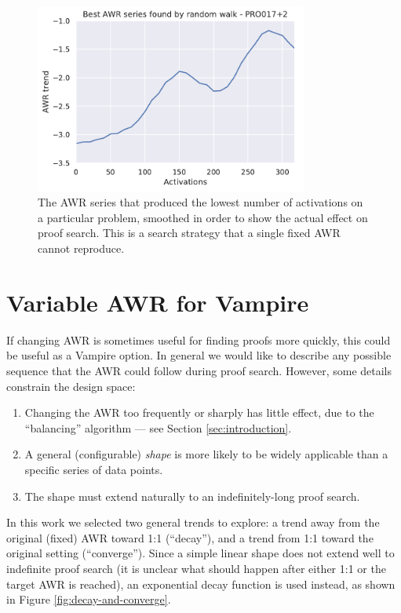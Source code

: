 \documentclass{llncs}
\begin{document}
\begin{figure}
	\centering
	\includegraphics[width=0.8\textwidth]{random-walk}
	\caption{The AWR series that produced the lowest number of activations on a particular problem, smoothed in order to show the actual effect on proof search. This is a search strategy that a single fixed AWR cannot reproduce.}
	\label{fig:random-walk}
\end{figure}


\section{Variable AWR for Vampire}
\label{sec:variable}

If changing AWR is sometimes useful for finding proofs more quickly, this could be useful as a Vampire option.
In general we would like to describe any possible sequence that the AWR could follow during proof search.
However, some details constrain the design space:
\begin{enumerate}
	\item Changing the AWR too frequently or sharply has little effect, due to the ``balancing'' algorithm --- see Section \ref{sec:introduction}.
	\item A general (configurable) \emph{shape} is more likely to be widely applicable than a specific series of data points.
	\item The shape must extend naturally to an indefinitely-long proof search.
\end{enumerate}

In this work we selected two general trends to explore: a trend away from the original (fixed) AWR toward 1:1 (``decay''), and a trend from 1:1 toward the original setting (``converge'').
Since a simple linear shape does not extend well to indefinite proof search (it is unclear what should happen after either 1:1 or the target AWR is reached), an exponential decay function is used instead, as shown in Figure \ref{fig:decay-and-converge}.
\end{document}
